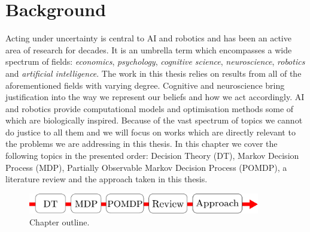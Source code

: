 \chapter{Background}

Acting under uncertainty is central to AI and robotics and has been an active area of research for decades. It
is an umbrella term which encompasses a wide spectrum of fields:  \textit{economics}, \textit{psychology}, 
\textit{cognitive science}, \textit{neuroscience}, \textit{robotics} and \textit{artificial intelligence}.
The work in this thesis relies on results from all of the aforementioned fields with varying degree.
Cognitive and neuroscience bring justification into the way we represent our beliefs and how we act accordingly. 
AI and robotics provide computational models and optimisation methods some of which are biologically inspired.
Because of the vast spectrum of topics we cannot do justice to all them and we will focus on works which are directly 
relevant to the problems we are addressing in this thesis.
In this chapter we cover the following topics in the presented order: Decision Theory (DT), Markov Decision Process (MDP), 
Partially Observable Markov Decision Process (POMDP), a literature review and the approach taken 
in this thesis.\\[0.05cm]

\begin{figure}[h]
 \centering
 \includegraphics[width=0.9\textwidth]{./ch2-Background/Figures/chap_overview.pdf}
  \caption{Chapter outline.}
  \label{fig:ch2_outline}
\end{figure}

